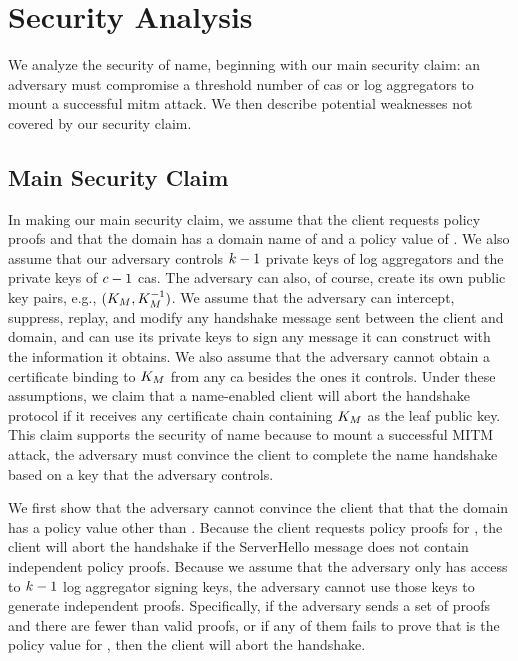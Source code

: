 \section{Security Analysis}
\label{sec:analysis}

We analyze the security of \ac{name}, beginning with
our main security claim: an adversary must compromise a threshold number
of \acp{ca} or log aggregators to mount a successful \ac{mitm} attack.
We then describe potential weaknesses not covered by our security claim.

\subsection{Main Security Claim}
\label{sec:analysis:informal}

In making our main security claim, we assume that the client requests \numlas
policy proofs and that the domain has a domain name of \domain and a policy
value of \policy. 
We also assume that our adversary controls $k - 1$
private keys of log aggregators and the private keys of $c - 1$ \acp{ca}.
The adversary can also, of course, create its own public key pairs, e.g., 
$(K_M, K_M^{-1})$.
We assume that the adversary
can intercept, suppress, replay, and modify any handshake message sent between
the client and domain, and can use its private keys to 
sign any message it can construct with the
information it obtains. We also assume that the adversary
cannot obtain a certificate binding \domain to $K_M$ from any \ac{ca}
besides the ones it controls. Under these assumptions, we claim that a \ac{name}-enabled client
will abort the handshake protocol if it receives any certificate chain
containing $K_M$ as the leaf public key. This claim 
supports the security of \ac{name} because to mount a successful MITM attack,
the adversary must convince the client to complete the \ac{name} handshake
based on a key that the adversary controls.

We first show that the adversary cannot convince the client that that the domain
has a policy value other than \policy. Because the client requests \numlas
policy proofs for \domain, the client will abort the handshake if the 
ServerHello message does not contain \numlas independent policy
proofs. Because we assume that the adversary only has access to $k - 1$
log aggregator signing keys, the adversary cannot use those keys to
generate \numlas independent proofs. Specifically, if the adversary sends a set
of proofs and there are fewer than \numlas valid proofs, or if any of them fails
to prove that \policy is the policy value for \domain, then the client will
abort the handshake.


